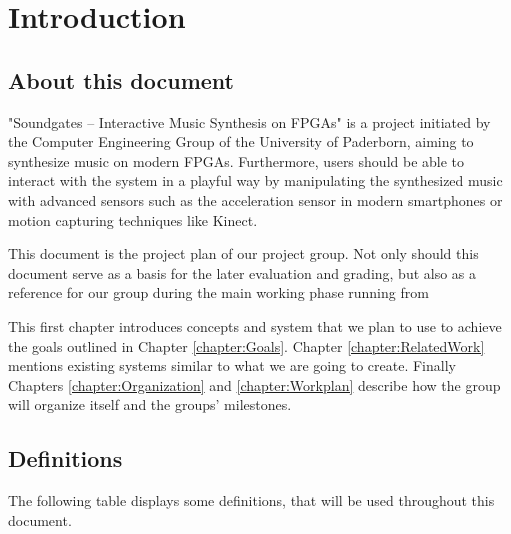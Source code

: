 \chapter{Introduction}
	\label{chapter:Introduction}
	\section{About this document}
	
"Soundgates – Interactive Music Synthesis on FPGAs" is a project initiated by the Computer Engineering Group of the University of Paderborn, aiming to synthesize music on modern FPGAs. 
Furthermore, users should be able to interact with the system in a playful way by manipulating the synthesized music with advanced sensors such as the acceleration sensor in modern smartphones or motion capturing techniques like Kinect.


This document is the project plan of our project group.
Not only should this document serve as a basis for the later evaluation and grading, 
but also as a reference for our group during the main working phase running from 

This first chapter introduces concepts and system that we plan to use to achieve the goals outlined in Chapter \ref{chapter:Goals}. 
Chapter \ref{chapter:RelatedWork} mentions existing systems similar to what we are going to create.
Finally Chapters \ref{chapter:Organization} and \ref{chapter:Workplan} describe how the group will organize itself and the groups' milestones.

	\section{Definitions}
	 The following table displays some definitions, that will be used throughout this document.
	 
